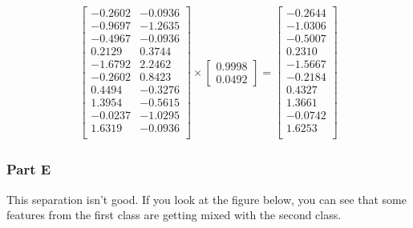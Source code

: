 \documentclass[12pt]{article}
\begin{document}
\begin{center}

\begin{gather*}
\begin{bmatrix}
-0.2602 & -0.0936\\
-0.9697 & -1.2635\\
-0.4967 & -0.0936\\
0.2129 & 0.3744\\
-1.6792 & 2.2462\\
-0.2602 & 0.8423\\
0.4494 & -0.3276\\
1.3954 & -0.5615\\
-0.0237 & -1.0295\\
1.6319 & -0.0936\\
\end{bmatrix}
\times
\begin{bmatrix}
0.9998\\
0.0492
\end{bmatrix}
=
\begin{bmatrix}
-0.2644\\
-1.0306\\
-0.5007\\
0.2310\\
-1.5667\\
-0.2184\\
0.4327\\
1.3661\\
-0.0742\\
1.6253\\
\end{bmatrix}
\end{gather*}
\end{center}

\pagebreak

\subsubsection{Part E}

This separation isn't good. If you look at the figure below, you can see that some features from the first class are getting mixed with the second class.
\end{document}
